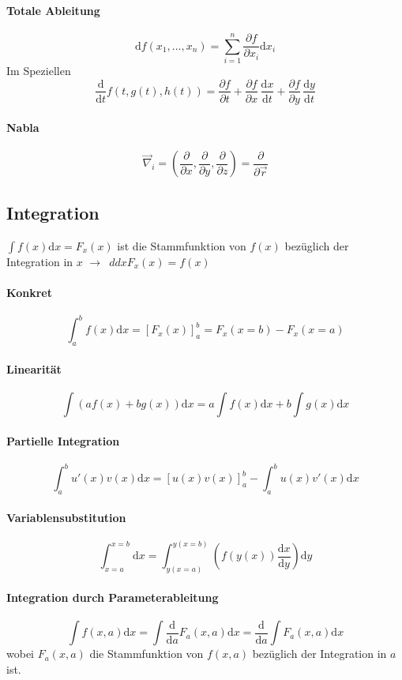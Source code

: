 \documentclass[oneside]{book}
\theoremstyle{definition}
\newcommand{\conseq}{$\rightarrow$~}
\renewcommand{\d}{\mathrm d}
\newcommand{\dd}[1]{\frac{\d}{\d #1}}
\newcommand{\fpartial}[1]{\frac{\partial}{\partial #1}}
\newcommand{\ffpartial}[2]{\frac{\partial #1}{\partial #2}}
\begin{document}
\paragraph{Totale Ableitung}
$$\d f(x_1, \dots, x_n) = \sum_{i = 1}^{n} \ffpartial{f}{x_i} \d x_i$$
Im Speziellen
$$\frac{\mathrm d}{\mathrm dt} f(t,g(t),h(t)) = \frac{\partial f}{\partial t} + \frac{\partial f}{\partial x} \, \frac{\mathrm dx}{\mathrm dt} + \frac{\partial f}{\partial y} \,\frac{\mathrm dy}{\mathrm dt} $$

\paragraph{Nabla}
$$\vec{\nabla}_i = (\fpartial{x}, \fpartial{y}, \fpartial{z}) = \fpartial{\vec{r}}$$

\subsection{Integration}
$\int f(x) \d x = F_x(x)$ ist die Stammfunktion von $f(x)$ bezüglich der Integration in $x$ \conseq $dd x F_x(x) = f(x)$

\paragraph{Konkret}
$$ \int_a^b f(x) \d x = [ F_x(x) ]_a^b = F_x(x = b) - F_x(x = a)$$

\paragraph{Linearität}
$$ \int (a f(x) + b g(x)) \d x = a \int f(x) \d x + b \int g(x) \d x$$

\paragraph{Partielle Integration}
$$\int_a^b u'(x)v(x) \d x = [u(x) v(x)]_a^b - \int_a^b u(x) v'(x) \d x$$

\paragraph{Variablensubstitution}
$$\int_{x = a}^{x = b} \d x = \int_{y(x = a)}^{y(x = b)} ( f(y(x))\frac{\d x}{\d y} ) \d y$$

\paragraph{Integration durch Parameterableitung}
$$\int f(x, a) \d x = \int \dd a F_a(x,a) \d x = \dd a \int F_a(x,a) \d x$$
wobei $F_a(x,a)$ die Stammfunktion von $f(x,a)$ bezüglich der Integration in $a$ ist.
\end{document}
